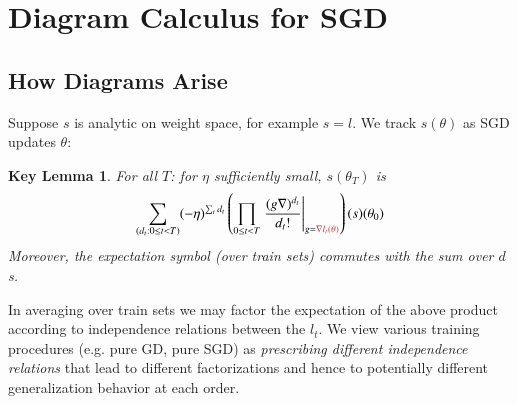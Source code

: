\documentclass{article}
\theoremstyle{plain}
\newtheorem*{klem*}{Key Lemma}
\theoremstyle{definition}
\begin{document}

\section{Diagram Calculus for SGD} \label{sect:calculus}


    \subsection{How Diagrams Arise}
        Suppose $s$ is analytic on weight space, for example $s=l$.
        We track $s(\theta)$ as SGD updates $\theta$: %
        \begin{klem*} %
            For all $T$: for $\eta$ sufficiently small, $s(\theta_T)$ is
            \begin{equation}\label{eq:dyson}
                \sum_{(d_t: 0\leq t<T)}
                (-\eta)^{\sum_t d_t}
                \left(
                    \prod_{0 \leq t < T}
                        \left.
                            \frac{(g \nabla)^{d_t}}{d_t!}
                        \right|_{g={\color{moor}\nabla l_t(\theta)}}
                \right)
                (s) (\theta_0)
            \end{equation}
            Moreover, the expectation symbol (over train sets) commutes with
            the sum over $d$s.
        \end{klem*}
        In averaging over train sets we may factor the expectation of the above
        product according to independence relations between the $l_t$.  We view
        various training procedures (e.g. pure GD, pure SGD) as
        \emph{prescribing different independence relations} that lead to
        different factorizations and hence to potentially different
        generalization behavior at each order.
    
\end{document}

